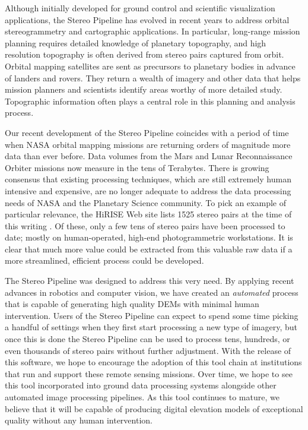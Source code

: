 Although initially developed for ground control and scientific
visualization applications, the Stereo Pipeline has evolved in recent
years to address orbital stereogrammetry and cartographic
applications.  In particular, long-range mission planning requires
detailed knowledge of planetary topography, and high resolution
topography is often derived from stereo pairs captured from orbit.
Orbital mapping satellites are sent as precursors to planetary bodies
in advance of landers and rovers.  They return a wealth of imagery and
other data that helps mission planners and scientists identify areas
worthy of more detailed study. Topographic information often plays a
central role in this planning and analysis process.

Our recent development of the Stereo Pipeline coincides with a
period of time when \ac{NASA} orbital mapping missions are returning
orders of magnitude more data than ever before.  Data volumes from
the Mars and Lunar Reconnaissance Orbiter missions now measure in
the tens of Terabytes.  There is growing consensus that existing
processing techniques, which are still extremely human intensive
and expensive, are no longer adequate to address the data processing
needs of \ac{NASA} and the Planetary Science community.  To pick
an example of particular relevance, the \ac{HiRISE} Web site lists
1525 stereo pairs at the time of this writing \citep{HiRISE_website}.
Of these, only a few tens of stereo pairs have been processed to
date; mostly on human-operated, high-end photogrammetric workstations.
It is clear that much more value could be extracted from this
valuable raw data if a more streamlined, efficient process could be
developed.

The Stereo Pipeline was designed to address this very need.  By
applying recent advances in robotics and computer vision, we have
created an {\em automated} process that is capable of generating high
quality \acp{DEM} with minimal human intervention.  Users of the Stereo
Pipeline can expect to spend some time picking a handful of settings
when they first start processing a new type of imagery, but once this
is done the Stereo Pipeline can be used to process tens, hundreds, or
even thousands of stereo pairs without further adjustment.  With the
release of this software, we hope to encourage the adoption of this
tool chain at institutions that run and support these remote sensing
missions.  Over time, we hope to see this tool incorporated into
ground data processing systems alongside other automated image
processing pipelines.  As this tool continues to mature, we believe
that it will be capable of producing digital elevation models of
exceptional quality without any human intervention.

